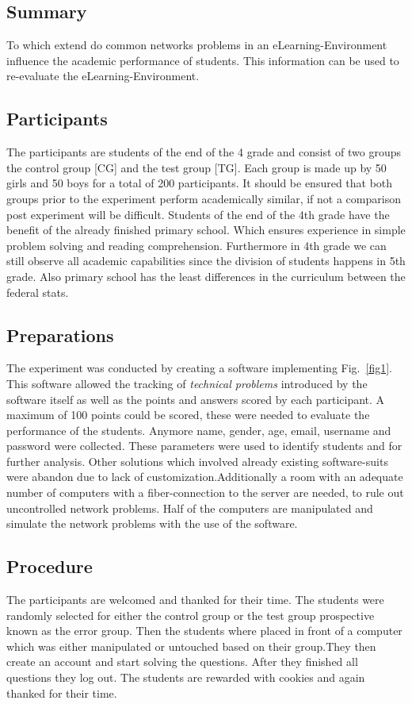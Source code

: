 \documentclass[runningheads]{llncs}
\begin{document}
\subsection{Summary}
To which extend do common networks problems in an eLearning-Environment
influence the academic performance of students. This information can be used to
re-evaluate the eLearning-Environment. 

\subsection{Participants}
The participants are students of the end of the 4 grade and consist of two groups the control group [CG] and
the test group [TG]. Each group is made up by 50 girls and 50 boys for a total of 200 participants.
It should be ensured that both groups prior to the experiment perform academically similar, if not a
comparison post experiment will be difficult. Students of the end of the 4th grade have the benefit of the
already finished primary school. Which ensures experience in simple problem solving and
reading comprehension. Furthermore in 4th grade we can still observe all academic capabilities
since the division of students happens in 5th grade. Also primary school has the least differences
in the curriculum between the federal stats.


\subsection{Preparations}
The experiment was conducted by creating a software implementing Fig.~\ref{fig1}.
This software\cite{ref_soft} allowed the tracking of {\itshape technical problems} introduced by
the software itself as well as the points and answers scored by each participant.
A maximum of 100 points could be scored, these were needed to evaluate the performance of
the students. Anymore name, gender, age, email, username and password were collected.
These parameters were used to identify students and for further analysis.
Other solutions which involved already existing software-suits were abandon due to lack
of customization.Additionally a room with an adequate number of computers with a fiber-connection
to the server are needed, to rule out uncontrolled network problems.
Half of the computers are manipulated and simulate the network problems with the
use of the software.

\subsection{Procedure}
The participants are welcomed and thanked for their time.
The students were randomly selected for either the control group or the test group
prospective known as the error group. Then the students where placed in front of a computer
which was either manipulated or untouched based on their group.They then create an account
and start solving the questions.
After they finished all questions they log out.
The students are rewarded with cookies and again thanked for their time.
\end{document}
